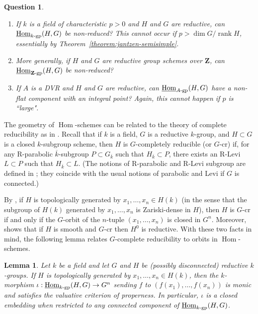 \documentclass[11pt, letterpaper,english]{amsart}
\theoremstyle{plain}
\newtheorem{lemma}[lem]{Lemma}
\newtheorem{question}[lem]{Question}
\theoremstyle{definition}
\numberwithin{equation}{section}
\numberwithin{lem}{section}
\newcommand{\mathfont}{\mathbf}
\newcommand{\bZ}{\mathfont{Z}}
\DeclareMathOperator{\Hom}{Hom}
\DeclareMathOperator{\rank}{rank}
\begin{document}
\begin{question}
\begin{enumerate}
\item  If $k$ is a field of characteristic $p > 0$ and $H$ and $G$ are reductive, can $\underline{\Hom}_{k\textrm{-}\rm{gp}}(H, G)$ be non-reduced? This cannot occur if $p > \dim G/\rank H$, essentially by Theorem~\ref{theorem:jantzen-semisimple}.

\item More generally, if $H$ and $G$ are reductive group schemes over $\bZ$, can $\underline{\Hom}_{\bZ\textrm{-}\rm{gp}}(H, G)$ be non-reduced?

\item If $A$ is a DVR and $H$ and $G$ are reductive, can $\underline{\Hom}_{A\textrm{-}\rm{gp}}(H, G)$ have a non-flat component with an integral point? Again, this cannot happen if $p$ is ``large".
\end{enumerate}
\end{question}

The geometry of $\Hom$-schemes can be related to the theory of complete reducibility as in \cite{BMR05}. Recall that if $k$ is a field, $G$ is a reductive $k$-group, and $H \subset G$ is a closed $k$-subgroup scheme, then $H$ is $G$-completely reducible (or $G$-cr) if, for any R-parabolic $\overline{k}$-subgroup $P \subset G_{\overline{k}}$ such that $H_{\overline{k}} \subset P$, there exists an R-Levi $L \subset P$ such that $H_{\overline{k}} \subset L$. (The notions of R-parabolic and R-Levi subgroup are defined in \cite[Section 6]{BMR05}; they coincide with the usual notions of parabolic and Levi if $G$ is connected.)

By \cite[Proposition 2.16, Theorem 3.1, Section 6]{BMR05}, if $H$ is topologically generated by $x_1, \dots, x_n \in H(k)$ (in the sense that the subgroup of $H(k)$ generated by $x_1, \dots, x_n$ is Zariski-dense in $H$), then $H$ is $G$-cr if and only if the $G$-orbit of the $n$-tuple $(x_1, \dots, x_n)$ is closed in $G^n$. Moreover, \cite[Property 4]{Serre03} shows that if $H$ is smooth and $G$-cr then $H^0$ is reductive. With these two facts in mind, the following lemma relates $G$-complete reducibility to orbits in $\Hom$-schemes.

\begin{lemma}\label{lemma:bmr}
Let $k$ be a field and let $G$ and $H$ be (possibly disconnected) reductive $k$-groups. If $H$ is topologically generated by $x_1, \dots, x_n \in H(k)$, then the $k$-morphism $\iota: \underline{\Hom}_{k\textrm{-}\rm{gp}}(H, G) \to G^n$ sending $f$ to $(f(x_1), \dots, f(x_n))$ is monic and satisfies the valuative criterion of properness. In particular, $\iota$ is a closed embedding when restricted to any connected component of $\underline{\Hom}_{k\textrm{-}\rm{gp}}(H, G)$.
\end{lemma}
\end{document}

